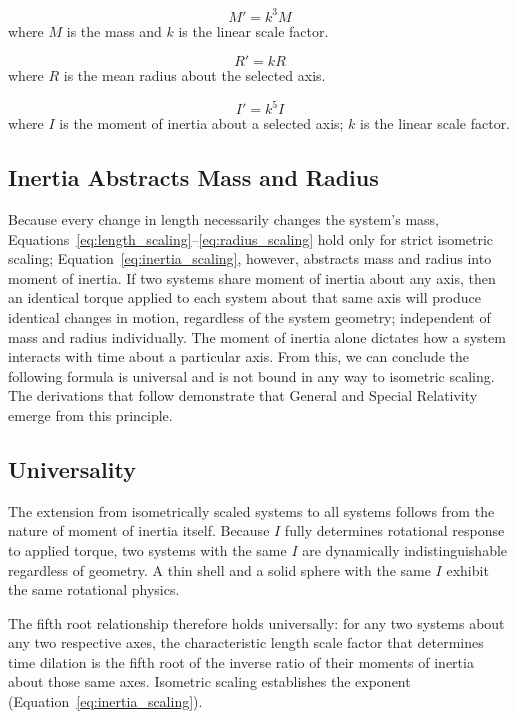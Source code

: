 \documentclass[twoside,twocolumn,9pt]{article}
\begin{document}
\begin{equation} \label{eq:mass_scaling}
M' = k^3 M
\end{equation}
where $M$ is the mass and $k$ is the linear scale factor.

\begin{equation} \label{eq:radius_scaling}
R' = kR
\end{equation}
where $R$ is the mean radius about the selected axis.

\begin{equation} \label{eq:inertia_scaling}
I' = k^5 I
\end{equation}
where $I$ is the moment of inertia about a selected axis; $k$ is the linear scale factor.

\subsection{Inertia Abstracts Mass and Radius}
Because every change in length necessarily changes the system's mass, Equations~\ref{eq:length_scaling}--\ref{eq:radius_scaling} hold only for strict isometric scaling; Equation~\ref{eq:inertia_scaling}, however, abstracts mass and radius into moment of inertia. If two systems share moment of inertia about any axis, then an identical torque applied to each system about that same axis will produce identical changes in motion, regardless of the system geometry; independent of mass and radius individually. The moment of inertia alone dictates how a system interacts with time about a particular axis. From this, we can conclude the following formula is universal and is not bound in any way to isometric scaling. The derivations that follow demonstrate that General and Special Relativity emerge from this principle.

\subsection{Universality}
The extension from isometrically scaled systems to all systems follows from the nature of moment of inertia itself. Because $I$ fully determines rotational response to applied torque, two systems with the same $I$ are dynamically indistinguishable regardless of geometry. A thin shell and a solid sphere with the same $I$ exhibit the same rotational physics.

The fifth root relationship therefore holds universally: for any two systems about any two respective axes, the characteristic length scale factor that determines time dilation is the fifth root of the inverse ratio of their moments of inertia about those same axes. Isometric scaling establishes the exponent (Equation~\ref{eq:inertia_scaling}).
\end{document}
